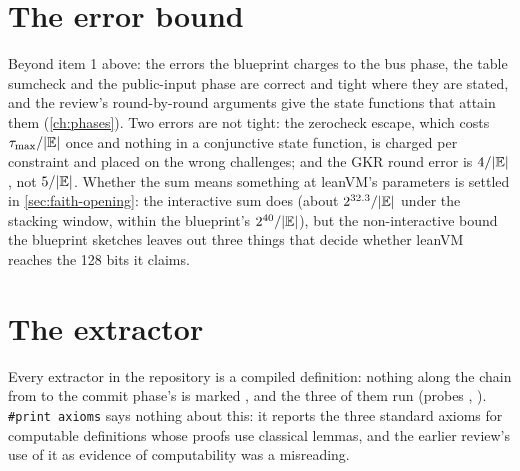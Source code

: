 \section{The error bound}\label{sec:nv-error}

Beyond item 1 above: the errors the blueprint charges to the bus phase, the table sumcheck and
the public-input phase are correct and tight where they are stated, and the review's
round-by-round arguments give the state functions that attain them (\cref{ch:phases}). Two
errors are not tight: the zerocheck escape, which costs $\tau_{\max} / \lvert \mathbb{E}\rvert$ once and
nothing in a conjunctive state function, is charged per constraint and placed on the wrong
challenges; and the GKR round error is $4 / \lvert \mathbb{E}\rvert$, not $5 / \lvert \mathbb{E}\rvert$. Whether the sum
means something at leanVM's parameters is settled in \cref{sec:faith-opening}: the interactive
sum does (about $2^{32.3} / \lvert \mathbb{E}\rvert$ under the stacking window, within the blueprint's
$2^{40} / \lvert \mathbb{E}\rvert$), but the non-interactive
bound the blueprint sketches leaves out three things that decide whether leanVM reaches the
128 bits it claims.

\section{The extractor}\label{sec:nv-extractor}

Every extractor in the repository is a compiled definition: nothing along the chain from
 to the commit phase's is marked , and the three of them
run (probes , ). \texttt{\#print axioms} says nothing about this:
it reports the three standard axioms for computable definitions whose proofs use classical
lemmas, and the earlier review's use of it as evidence of computability was a misreading.

